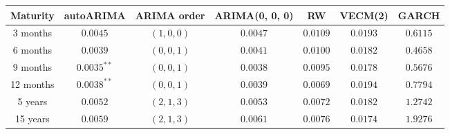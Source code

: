 \centering
\begin{tabular}{|c c c c c c c|} 
    \hline
    Maturity & autoARIMA & ARIMA order & ARIMA(0, 0, 0) & RW & VECM(2) & GARCH \\
    \hline
    3 months & $0.0045$ & $(1,0,0)$ & $0.0047$ & $0.0109$ & $0.0193$ & $0.6115$ \\ 
    \hline
    6 months & $0.0039$ & $(0,0,1)$ & 0.$0041$ & $0.0100$ & $0.0182$ & $0.4658$ \\
    \hline
    9 months & $0.0035^{**}$ & $(0,0,1)$ & $0.0038$ & $0.0095$ & $0.0178$ & $0.5676$ \\
    \hline
    12 months & $0.0038^{**}$ & $(0,0,1)$ & $0.0039$ & $0.0069$ & $0.0194$ & $0.7794$ \\
    \hline
    5 years & $0.0052$ & $(2,1,3)$ & $0.0053$ & $0.0072$ & $0.0182$ & $1.2742$\\
    \hline
    15 years & $0.0059$ & $(2,1,3)$ & $0.0061$ & $0.0076$ & $0.0174$ & $1.9276$ \\ 
    \hline
\end{tabular}
